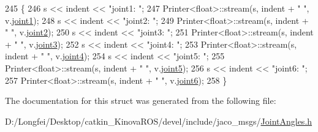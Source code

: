 \begin{DoxyCode}
245   \{
246     s << indent << \textcolor{stringliteral}{"joint1: "};
247     Printer<float>::stream(s, indent + \textcolor{stringliteral}{"  "}, v.\hyperlink{structjaco__msgs_1_1JointAngles___a5ebadd874f74af99d452dc42787489b7}{joint1});
248     s << indent << \textcolor{stringliteral}{"joint2: "};
249     Printer<float>::stream(s, indent + \textcolor{stringliteral}{"  "}, v.\hyperlink{structjaco__msgs_1_1JointAngles___ad7bfb312caeafc6b2cb1fc02c6a3e116}{joint2});
250     s << indent << \textcolor{stringliteral}{"joint3: "};
251     Printer<float>::stream(s, indent + \textcolor{stringliteral}{"  "}, v.\hyperlink{structjaco__msgs_1_1JointAngles___ae8e5d407b34f0a6acd368ec1a28df526}{joint3});
252     s << indent << \textcolor{stringliteral}{"joint4: "};
253     Printer<float>::stream(s, indent + \textcolor{stringliteral}{"  "}, v.\hyperlink{structjaco__msgs_1_1JointAngles___accb31f45f3a313794a9cab57b8a9b952}{joint4});
254     s << indent << \textcolor{stringliteral}{"joint5: "};
255     Printer<float>::stream(s, indent + \textcolor{stringliteral}{"  "}, v.\hyperlink{structjaco__msgs_1_1JointAngles___ad02e456e0b382b2bf59b4eeb93318921}{joint5});
256     s << indent << \textcolor{stringliteral}{"joint6: "};
257     Printer<float>::stream(s, indent + \textcolor{stringliteral}{"  "}, v.\hyperlink{structjaco__msgs_1_1JointAngles___a474d9f2a0e329ba6bd08c8fa265e9a50}{joint6});
258   \}
\end{DoxyCode}


The documentation for this struct was generated from the following file\+:\begin{DoxyCompactItemize}
\item 
D\+:/\+Longfei/\+Desktop/catkin\+\_\+\+Kinova\+R\+O\+S/devel/include/jaco\+\_\+msgs/\hyperlink{JointAngles_8h}{Joint\+Angles.\+h}\end{DoxyCompactItemize}
